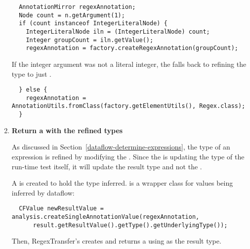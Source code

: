 \begin{enumerate}
\begin{smaller}
  \begin{Verbatim}
  AnnotationMirror regexAnnotation;
  Node count = n.getArgument(1);
  if (count instanceof IntegerLiteralNode) {
    IntegerLiteralNode iln = (IntegerLiteralNode) count;
    Integer groupCount = iln.getValue();
    regexAnnotation = factory.createRegexAnnotation(groupCount);

\end{Verbatim}
\end{smaller}

If the integer argument was not a literal integer, the
 falls back to refining the type to just
.

\begin{smaller}
\begin{Verbatim}
  } else {
    regexAnnotation = AnnotationUtils.fromClass(factory.getElementUtils(), Regex.class);
  }
\end{Verbatim}
\end{smaller}

\item \textbf{Return a  with the
    refined types}

As discussed in Section~\ref{dataflow-determine-expressions}, the type of an
expression is refined by modifying the
.  Since the
 is updating the type of the run-time
test itself, it will update the result type and not the
.

A  is created to hold the type inferred.
 is a wrapper class for values being inferred
by dataflow:
\begin{smaller}
\begin{Verbatim}
  CFValue newResultValue = analysis.createSingleAnnotationValue(regexAnnotation,
      result.getResultValue().getType().getUnderlyingType());
\end{Verbatim}
\end{smaller}

Then, RegexTransfer's  creates and returns a
 using  as the
result type.


\end{enumerate}
